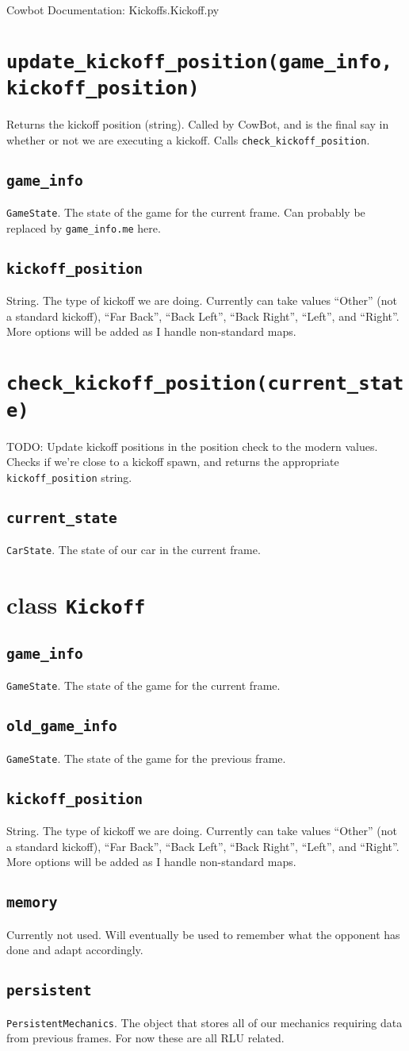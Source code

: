 \documentclass{article}
\newcommand{\class}[1]{\section{class \texttt{#1}}}
\newcommand{\function}[1]{\section{\texttt{#1}}}
\newcommand{\argumenta}[1]{\subsection{\texttt{#1}}}
\begin{document}
\begin{flushleft}

\begin{center}
  Cowbot Documentation: Kickoffs.Kickoff.py
\end{center}



\function{update\_kickoff\_position(game\_info, kickoff\_position)}
         {
           Returns the kickoff position (string).  Called by CowBot, and is the final say in whether or not we are executing a kickoff.  Calls \texttt{check\_kickoff\_position}.

           \argumenta{game\_info}
                     {
                       \texttt{GameState}.  The state of the game for the current frame.  Can probably be replaced by \texttt{game\_info.me} here.
                     }
           \argumenta{kickoff\_position}
                     {
                       String.  The type of kickoff we are doing.  Currently can take values ``Other'' (not a standard kickoff), ``Far Back'', ``Back Left'', ``Back Right'', ``Left'', and ``Right''.  More options will be added as I handle non-standard maps.
                     }
         }
         


\function{check\_kickoff\_position(current\_state)}
         {TODO: Update kickoff positions in the position check to the modern values.\\
           Checks if we're close to a kickoff spawn, and returns the appropriate \texttt{kickoff\_position} string.

           \argumenta{current\_state}
                     {
                       \texttt{CarState}. The state of our car in the current frame.
                     }
         }


\class{Kickoff}
      {

        \argumenta{game\_info}
                  {
                     \texttt{GameState}.  The state of the game for the current frame.
                  }
        \argumenta{old\_game\_info}
                  {
                     \texttt{GameState}.  The state of the game for the previous frame.
                  }
        \argumenta{kickoff\_position}
                  {
                    String.  The type of kickoff we are doing.  Currently can take values ``Other'' (not a standard kickoff), ``Far Back'', ``Back Left'', ``Back Right'', ``Left'', and ``Right''.  More options will be added as I handle non-standard maps.
                  }
        \argumenta{memory}
                  {
                    Currently not used.  Will eventually be used to remember what the opponent has done and adapt accordingly.
                  }
        \argumenta{persistent}
                  {
                    \texttt{PersistentMechanics}. The object that stores all of our mechanics requiring data from previous frames. For now these are all RLU related.
                  }
           
}
\end{flushleft}
\end{document}
